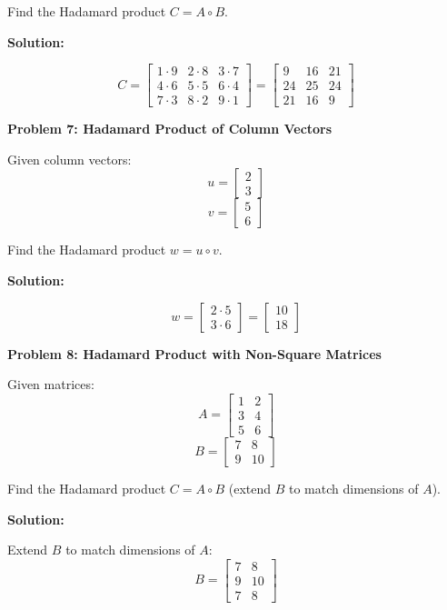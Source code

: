 \documentclass[
  letterpaper,
  DIV=11,
  numbers=noendperiod]{scrreprt}
\theoremstyle{plain}
\theoremstyle{definition}
\theoremstyle{remark}
\begin{document}
Find the Hadamard product \(C=A\circ B\).

\textbf{Solution:}

\[C=\begin{bmatrix}
1\cdot9&2\cdot8&3\cdot7\\
4\cdot6&5\cdot5&6\cdot4\\
7\cdot3&8\cdot2&9\cdot1
\end{bmatrix}=
\begin{bmatrix}
9&16&21\\
24&25&24\\
21&16&9
\end{bmatrix}\]

\textbf{Problem 7: Hadamard Product of Column Vectors}

Given column vectors: \[u=\begin{bmatrix}2\\3\end{bmatrix}\]
\[v=\begin{bmatrix}5\\6\end{bmatrix}\]

Find the Hadamard product \(w=u\circ v\).

\textbf{Solution:}

\[w=\begin{bmatrix}
2\cdot5\\
3\cdot6
\end{bmatrix}=
\begin{bmatrix}
10\\
18
\end{bmatrix}\]

\textbf{Problem 8: Hadamard Product with Non-Square Matrices}

Given matrices: \[A=\begin{bmatrix}1&2\\3&4\\5&6\end{bmatrix}\]
\[B=\begin{bmatrix}7&8\\9&10\end{bmatrix}\]

Find the Hadamard product \(C=A\circ B\) (extend \(B\) to match
dimensions of \(A\)).

\textbf{Solution:}

Extend \(B\) to match dimensions of \(A\):
\[B=\begin{bmatrix}7&8\\9&10\\7&8\end{bmatrix}\]
\end{document}

